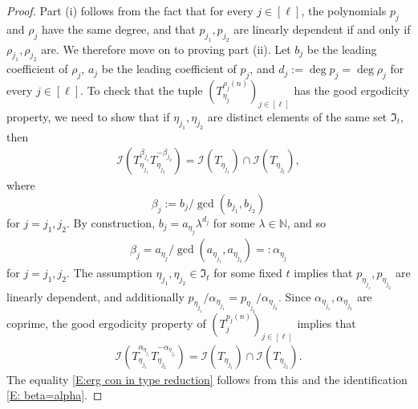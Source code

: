 \documentclass[11pt]{amsart}
\theoremstyle{definition}
\newcommand{\N}{{\mathbb N}}
\newcommand{\CI}{{\mathcal I}}
\newcommand{\FI}{{\mathfrak I}}
\newcommand{\brac}[1]{\mathopen{}\left( #1 \mathclose{}\right)}
\begin{document}
\begin{proof}
Part (i) follows from the fact that for every $j\in[\ell]$, the polynomials $p_j$ and $\rho_j$ have the same degree, and that $p_{j_1}, p_{j_2}$ are linearly dependent if and only if $\rho_{j_1}, \rho_{j_2}$ are. We therefore move on to proving part (ii). Let $b_j$ be the leading coefficient of $\rho_j$, $a_j$ be the leading coefficient of $p_j$, and $d_j:= \deg p_j = \deg \rho_j$ for every $j\in[\ell]$. To check that the tuple $\brac{T_{\eta_j}^{\rho_j(n)}}_{j\in[\ell]}$ has the good ergodicity property, we need to show that if $\eta_{j_1}, \eta_{j_2}$ are distinct elements of the same set $\FI_{t}$, then
\begin{align}\label{E:erg con in type reduction}
    \CI(T_{\eta_{j_1}}^{\beta_{j_1}} T_{\eta_{j_2}}^{-\beta_{j_2}})=\CI(T_{\eta_{j_1}})\cap\CI(T_{\eta_{j_2}}),
\end{align}
where $$\beta_{j} := b_{j}/\gcd(b_{j_1}, b_{j_2})$$ for $j = j_1, j_2$.  By construction, $b_j = a_{\eta_j}\lambda^{d_j}$ for some $\lambda\in\N$, and so
\begin{align}\label{E: beta=alpha}
    \beta_{j} = a_{\eta_j}/\gcd(a_{\eta_{j_1}}, a_{\eta_{j_2}})=:\alpha_{\eta_j}
\end{align}
for $j= j_1, j_2$. The assumption $\eta_{j_1}, \eta_{j_2}\in\FI_t$ for some fixed $t$ implies that $p_{\eta_{j_1}}, p_{\eta_{j_2}}$ are linearly dependent, and additionally $p_{\eta_{j_1}}/\alpha_{\eta_{j_1}} = p_{\eta_{j_2}}/\alpha_{\eta_{j_2}}$. Since $\alpha_{\eta_{j_1}}, \alpha_{\eta_{j_2}}$ are coprime, the good ergodicity property of $\brac{T_j^{p_j(n)}}_{j\in[\ell]}$ implies that
\begin{align*}
    \CI(T_{\eta_{j_1}}^{\alpha_{\eta_{j_1}}} T_{\eta_{j_2}}^{-\alpha_{\eta_{j_2}}})=\CI(T_{\eta_{j_1}})\cap\CI(T_{\eta_{j_2}}).
\end{align*}
The equality \eqref{E:erg con in type reduction} follows from this and the identification \eqref{E: beta=alpha}.
\end{proof}
\end{document}
